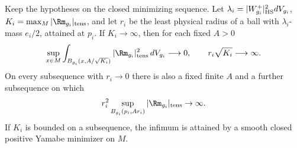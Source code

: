 \begin{corollary}\label{cor:energy-radius}
Keep the hypotheses on the closed minimizing sequence. Let
\(\lambda_i=|W^+_{g_i}|_{\rm HS}^2dV_{g_i}\),
\(K_i=\max_M|\Rm_{g_i}|_{\rm tens}\), and let \(r_i\) be the
least physical radius of a ball with \(\lambda_i\)-mass \(e_i/2\),
attained at \(p_i\). If \(K_i\to\infty\), then for each fixed \(A>0\)
\begin{equation}\label{eq:peak-energy}
 \sup_{x\in M}\int_{B_{g_i}(x,A/\sqrt{K_i})}
              |\Rm_{g_i}|_{\rm tens}^2\,dV_{g_i}\longrightarrow0,
 \qquad r_i\sqrt{K_i}\longrightarrow\infty .
\end{equation}
On every subsequence with \(r_i\to0\) there is also a fixed finite
\(A\) and a further subsequence on which
\[
 r_i^2\sup_{B_{g_i}(p_i,A r_i)}|\Rm_{g_i}|_{\rm tens}\to\infty .
\]
If \(K_i\) is bounded on a subsequence, the infimum is attained by
a smooth closed positive Yamabe minimizer on \(M\).
\end{corollary}

